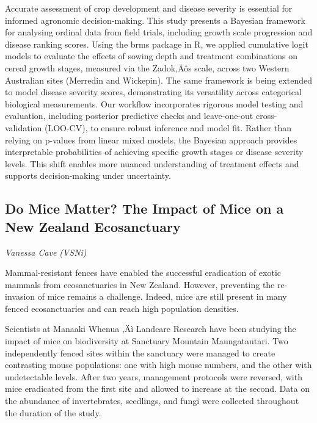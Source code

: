 \documentclass[
]{scrreprt}
\begin{document}
Accurate assessment of crop development and disease severity is
essential for informed agronomic decision-making. This study presents a
Bayesian framework for analysing ordinal data from field trials,
including growth scale progression and disease ranking scores. Using the
brms package in R, we applied cumulative logit models to evaluate the
effects of sowing depth and treatment combinations on cereal growth
stages, measured via the Zadok‚Äôs scale, across two Western Australian
sites (Merredin and Wickepin). The same framework is being extended to
model disease severity scores, demonstrating its versatility across
categorical biological measurements. Our workflow incorporates rigorous
model testing and evaluation, including posterior predictive checks and
leave-one-out cross-validation (LOO-CV), to ensure robust inference and
model fit. Rather than relying on p-values from linear mixed models, the
Bayesian approach provides interpretable probabilities of achieving
specific growth stages or disease severity levels. This shift enables
more nuanced understanding of treatment effects and supports
decision-making under uncertainty.

\subsection{Do Mice Matter? The Impact of Mice on a New Zealand
Ecosanctuary}\label{do-mice-matter-the-impact-of-mice-on-a-new-zealand-ecosanctuary}

\emph{Vanessa Cave} \emph{(VSNi)}

\setlength{\parskip}{0.5em}

Mammal-resistant fences have enabled the successful eradication of
exotic mammals from ecosanctuaries in New Zealand. However, preventing
the re-invasion of mice remains a challenge. Indeed, mice are still
present in many fenced ecosanctuaries and can reach high population
densities.

Scientists at Manaaki Whenua ‚Äì Landcare Research have been studying
the impact of mice on biodiversity at Sanctuary Mountain Maungatautari.
Two independently fenced sites within the sanctuary were managed to
create contrasting mouse populations: one with high mouse numbers, and
the other with undetectable levels. After two years, management
protocols were reversed, with mice eradicated from the first site and
allowed to increase at the second. Data on the abundance of
invertebrates, seedlings, and fungi were collected throughout the
duration of the study.
\end{document}
